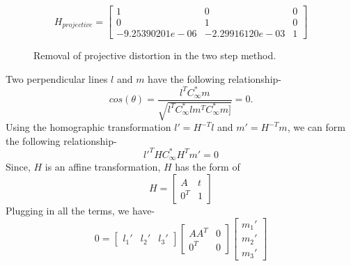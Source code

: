 \documentclass{article}
\begin{document}
\newpage
\begin{equation*}
	H_{projective} = \begin{bmatrix}
	1 & 0 & 0\\ 0 & 1 & 0\\-9.25390201e-06 & -2.29916120e-03 & 1
	\end{bmatrix}
\end{equation*}
\begin{figure}[!htbp]
     \centering
    \captionsetup[subfigure]{labelformat=empty}
    \caption{Removal of projective distortion in the two step method.}
    \label{fig:2_step_1(2)}
\end{figure}
\newpage
Two perpendicular lines $l$ and $m$  have the following relationship-
\begin{equation}
cos(\theta) = \frac{l^TC_\infty^*m}{\sqrt{l^TC_\infty^*l m^TC_\infty^*m]}} = 0.
\end{equation}
Using the homographic transformation $l'=H^{-T}l$ and $m'=H^{-T}m$, we can form the following relationship-
\begin{equation}
	l'^THC^*_\infty H^Tm' = 0
\end{equation}
Since, $H$ is an affine transformation, $H$ has the form of
\begin{equation}
	H = \begin{bmatrix}
		A & t \\ 0^T & 1
	\end{bmatrix}
\end{equation}
Plugging in all the terms, we have-
\begin{equation}
	0 = \begin{bmatrix}l_1' & l_2' & l_3'\end{bmatrix} \begin{bmatrix}AA^T & 0 \\ 0^T & 0\end{bmatrix}\begin{bmatrix}m_1' \\ m_2' \\ m_3'\end{bmatrix}
\end{equation}
\end{document}
